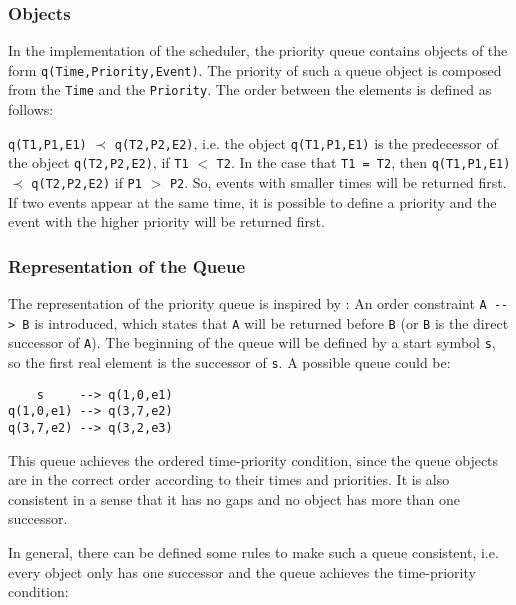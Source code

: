 \subsubsection{Objects}

In the implementation of the scheduler, the priority queue contains objects of the form \lstinline|q(Time,Priority,Event)|. The priority of such a queue object is composed from the \lstinline|Time| and the \lstinline|Priority|. The order between the elements is defined as follows:

\begin{definition}
\lstinline|q(T1,P1,E1)| $\prec$ \lstinline|q(T2,P2,E2)|, i.e. the object \lstinline|q(T1,P1,E1)| is the predecessor of the object \lstinline|q(T2,P2,E2)|, if \lstinline|T1| $<$ \lstinline|T2|. In the case that \lstinline|T1 = T2|, then \lstinline|q(T1,P1,E1)| $\prec$ \lstinline|q(T2,P2,E2)| if \lstinline|P1| $>$ \lstinline|P2|. So, events with smaller times will be returned first. If two events appear at the same time, it is possible to define a priority and the event with the higher priority will be returned first. 
\end{definition}

\subsubsection{Representation of the Queue}

The representation of the priority queue is inspired by \cite[38\psqq]{fru_chr_book_2009}: An order constraint \lstinline|A --> B| is introduced, which states that \lstinline|A| will be returned before \lstinline|B| (or \lstinline|B| is the direct successor of \lstinline|A|). The beginning of the queue will be defined by a start symbol \lstinline|s|, so the first real element is the successor of \lstinline|s|. A possible queue could be:

\begin{lstlisting}
    s     --> q(1,0,e1)
q(1,0,e1) --> q(3,7,e2)
q(3,7,e2) --> q(3,2,e3)
\end{lstlisting}

This queue achieves the ordered time-priority condition, since the queue objects are in the correct order according to their times and priorities. It is also consistent in a sense that it has no gaps and no object has more than one successor.

In general, there can be defined some rules to make such a queue consistent, i.e. every object only has one successor and the queue achieves the time-priority condition:

